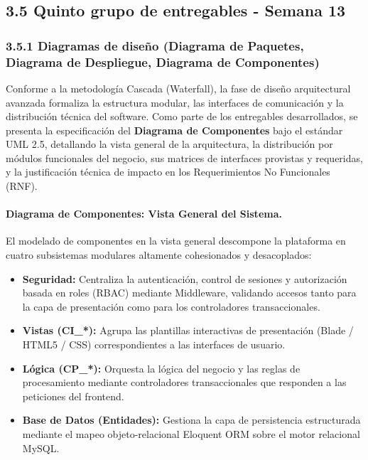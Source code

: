 \documentclass[12pt,a4paper]{article}
\begin{document}
\subsection{3.5 Quinto grupo de entregables - Semana 13}

\subsubsection{3.5.1 Diagramas de dise\~no (Diagrama de Paquetes, Diagrama de Despliegue, Diagrama de Componentes)}

Conforme a la metodología Cascada (Waterfall), la fase de diseño arquitectural avanzada formaliza la estructura modular, las interfaces de comunicación y la distribución técnica del software. Como parte de los entregables desarrollados, se presenta la especificación del \textbf{Diagrama de Componentes} bajo el estándar UML 2.5, detallando la vista general de la arquitectura, la distribución por módulos funcionales del negocio, sus matrices de interfaces provistas y requeridas, y la justificación técnica de impacto en los Requerimientos No Funcionales (RNF).

\paragraph{Diagrama de Componentes: Vista General del Sistema.}
El modelado de componentes en la vista general descompone la plataforma en cuatro subsistemas modulares altamente cohesionados y desacoplados:
\begin{itemize}
    \item \textbf{Seguridad:} Centraliza la autenticación, control de sesiones y autorización basada en roles (RBAC) mediante Middleware, validando accesos tanto para la capa de presentación como para los controladores transaccionales.
    \item \textbf{Vistas (CI\_*):} Agrupa las plantillas interactivas de presentación (Blade / HTML5 / CSS) correspondientes a las interfaces de usuario.
    \item \textbf{Lógica (CP\_*):} Orquesta la lógica del negocio y las reglas de procesamiento mediante controladores transaccionales que responden a las peticiones del frontend.
    \item \textbf{Base de Datos (Entidades):} Gestiona la capa de persistencia estructurada mediante el mapeo objeto-relacional Eloquent ORM sobre el motor relacional MySQL.
\end{itemize}
\end{document}
